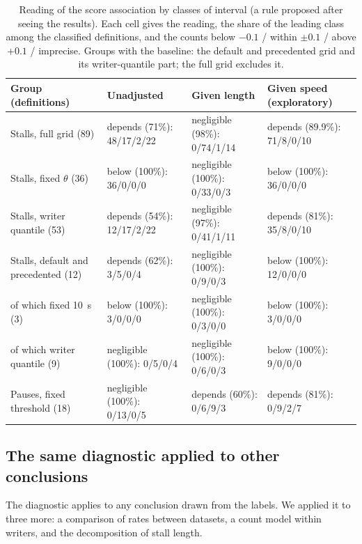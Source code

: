 \begin{table}[t]
\centering\scriptsize\setlength{\tabcolsep}{3pt}
\caption{Reading of the score association by classes of interval (a rule proposed after seeing the results). Each
cell gives the reading, the share of the leading class among the classified definitions, and the counts below
$-0.1$ / within $\pm 0.1$ / above $+0.1$ / imprecise. Groups with the baseline: the default and precedented grid and
its writer-quantile part; the full grid excludes it.}
\label{tab:read}
\begin{tabular}{@{}l l l l@{}}
\toprule
Group (definitions) & Unadjusted & Given length & Given speed (exploratory) \\
\midrule
Stalls, full grid (89) & depends (71\%): 48/17/2/22 & negligible (98\%): 0/74/1/14 & depends (89.9\%): 71/8/0/10 \\
Stalls, fixed $\theta$ (36) & below (100\%): 36/0/0/0 & negligible (100\%): 0/33/0/3 & below (100\%): 36/0/0/0 \\
Stalls, writer quantile (53) & depends (54\%): 12/17/2/22 & negligible (97\%): 0/41/1/11 & depends (81\%): 35/8/0/10 \\
Stalls, default and precedented (12) & depends (62\%): 3/5/0/4 & negligible (100\%): 0/9/0/3 & below (100\%): 12/0/0/0 \\
\quad of which fixed 10~s (3) & below (100\%): 3/0/0/0 & negligible (100\%): 0/3/0/0 & below (100\%): 3/0/0/0 \\
\quad of which writer quantile (9) & negligible (100\%): 0/5/0/4 & negligible (100\%): 0/6/0/3 & below (100\%): 9/0/0/0 \\
Pauses, fixed threshold (18) & negligible (100\%): 0/13/0/5 & depends (60\%): 0/6/9/3 & depends (81\%): 0/9/2/7 \\
\bottomrule
\end{tabular}
\end{table}

\subsection{The same diagnostic applied to other conclusions}
\label{sec:res-other}

The diagnostic applies to any conclusion drawn from the labels. We applied it to three more: a comparison of rates
between datasets, a count model within writers, and the decomposition of stall length.

